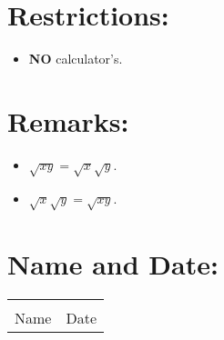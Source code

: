 \documentclass[12pt]{article} %
\begin{document}
	\section{Restrictions:}
  \begin{itemize}
		\item \textbf{NO} calculator's.
  \end{itemize}
  \section{Remarks:}
  \begin{itemize}
    \item $\sqrt{xy} = \sqrt{x} \sqrt{y}$.
    \item $\sqrt{x} \sqrt{y} = \sqrt{xy}$.
  \end{itemize}
	\section{Name and Date:}

  \vspace*{0.1cm}

	\begin{center}
	\noindent\begin{tabular}{ll}
		\makebox[3in]{\hrulefill} & \makebox[3in]{\hrulefill}\\
		Name & Date\\[8ex]%
	\end{tabular}
	\end{center}
	\newpage
\end{document}
